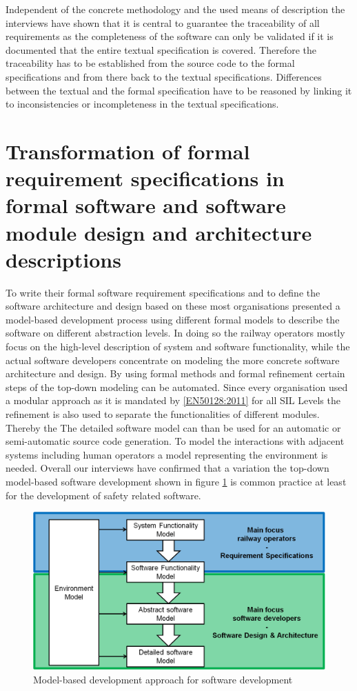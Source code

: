 \documentclass{./template/openetcs2}
\begin{document}
Independent of the concrete methodology and the used means of description the interviews have shown that it is central to guarantee the traceability of all requirements as the completeness of the software can only be validated if it is documented that the entire textual specification is covered. Therefore the traceability has to be established from the source code to the formal specifications and from there back to the textual specifications. Differences between the textual and the formal specification have to be reasoned by linking it to  inconsistencies or incompleteness in the textual specifications. 


\section{Transformation of formal requirement specifications in formal software and software module design and architecture descriptions}

To write their formal software requirement specifications and to define the software architecture and design based on these most organisations presented a model-based development process using different formal models to describe the software on different abstraction levels. In doing so the railway operators mostly focus on the high-level description of system and software functionality, while the actual software developers concentrate on modeling the more concrete software architecture and design. By using formal methods and formal refinement certain steps of the top-down modeling can be automated. Since every organisation used a modular approach as it is mandated by \ref{EN50128:2011} for all SIL Levels the refinement is also used to separate the functionalities of different modules. Thereby the The detailed software model can than be used for an automatic or semi-automatic source code generation. To model the interactions with adjacent systems including human operators a model representing the environment is needed. Overall our interviews have confirmed that a variation the top-down model-based software development shown in figure \ref{fig: MBD} is common practice at least for the development of safety related software. 

\begin{figure}[h]
\centering
\includegraphics[scale=0.6]{Model-based_Approach.png}
\caption{Model-based development approach for software development}
\label{fig: MBD}
\end{figure}
\end{document}

